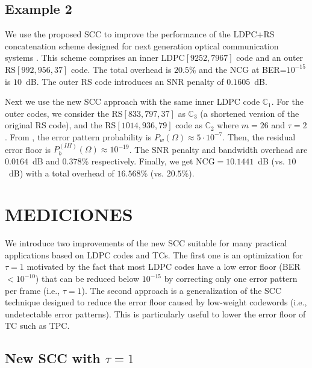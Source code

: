 \documentclass[conference]{IEEEtran}
\newcommand{\C}{\mathbb{C}}  %
\begin{document}
\subsection{Example 2} 
We use the proposed SCC to improve the performance of the LDPC+RS
concatenation scheme designed for next generation optical
communication systems \cite{4528592}. This scheme comprises an inner
LDPC$[9252,7967]$ code and an outer RS$[992,956,37]$ code. The total
overhead is $20.5\%$ and the NCG at BER=$10^{-15}$ is $10$~dB. The
outer RS code introduces an SNR penalty of $0.1605$~dB.

Next we use the new SCC approach with the same inner LDPC code
$\C_1$. For the outer codes, we consider the RS$[833,797,37]$ as
$\C_3$ (a shortened version of the original RS code), and the
RS$[1014,936,79]$ code as $\C_2$ where $m=26$ and $\tau=2$.  From
\cite{4528592}, the error pattern probability is $P_w(\Omega)\approx
5\cdot 10^{-7}$. Then, the residual error floor is
$P_b^{(I\!I\!I)}(\Omega)\approx 10^{-19}$. The SNR penalty and
bandwidth overhead are $0.0164$~dB and $0.378\%$
respectively. Finally, we get NCG$=10.1441$~dB (vs. $10$~dB) with a
total overhead of $16.568\%$ (vs. $20.5\%$).


\section{MEDICIONES} \label{sec:improvements}

We introduce two improvements of the new SCC suitable for many
practical applications based on LDPC codes and TCs. The first one is
an optimization for $\tau=1$ motivated by the fact that most LDPC
codes have a low error floor (BER$<10^{-10}$) that can be reduced
below $10^{-15}$ by correcting only one error pattern per frame (i.e.,
$\tau=1$). The second approach is a generalization of the SCC
technique designed to reduce the error floor caused by low-weight
codewords (i.e., undetectable error patterns). This is particularly
useful to lower the error floor of TC such as TPC.

\subsection{New SCC with $\tau=1$} \label{sec:improvement_1}
\end{document}
